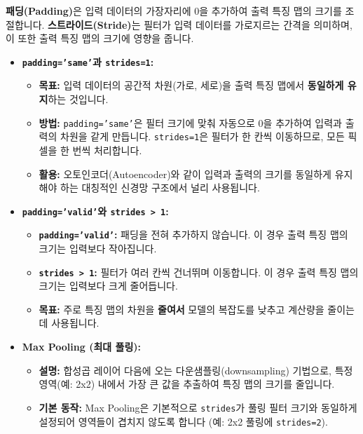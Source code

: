 \documentclass[11pt,a4paper]{article}
\theoremstyle{definition}
\begin{document}
\begin{tcolorbox}[summarybox, title=패딩과 스트라이드의 역할]
\textbf{패딩(Padding)}은 입력 데이터의 가장자리에 0을 추가하여 출력 특징 맵의 크기를 조절합니다.
\textbf{스트라이드(Stride)}는 필터가 입력 데이터를 가로지르는 간격을 의미하며, 이 또한 출력 특징 맵의 크기에 영향을 줍니다.
\end{tcolorbox}

\begin{itemize}
    \item \textbf{\texttt{padding='same'}과 \texttt{strides=1}:}
    \begin{itemize}
        \item \textbf{목표:} 입력 데이터의 공간적 차원(가로, 세로)을 출력 특징 맵에서 \textbf{동일하게 유지}하는 것입니다.
        \item \textbf{방법:} \texttt{padding='same'}은 필터 크기에 맞춰 자동으로 0을 추가하여 입력과 출력의 차원을 같게 만듭니다. \texttt{strides=1}은 필터가 한 칸씩 이동하므로, 모든 픽셀을 한 번씩 처리합니다.
        \item \textbf{활용:} 오토인코더(Autoencoder)와 같이 입력과 출력의 크기를 동일하게 유지해야 하는 대칭적인 신경망 구조에서 널리 사용됩니다.
    \end{itemize}
    \item \textbf{\texttt{padding='valid'}와 \texttt{strides > 1}:}
    \begin{itemize}
        \item \textbf{\texttt{padding='valid'}:} 패딩을 전혀 추가하지 않습니다. 이 경우 출력 특징 맵의 크기는 입력보다 작아집니다.
        \item \textbf{\texttt{strides > 1}:} 필터가 여러 칸씩 건너뛰며 이동합니다. 이 경우 출력 특징 맵의 크기는 입력보다 크게 줄어듭니다.
        \item \textbf{목표:} 주로 특징 맵의 차원을 \textbf{줄여서} 모델의 복잡도를 낮추고 계산량을 줄이는 데 사용됩니다.
    \end{itemize}
    \item \textbf{Max Pooling (최대 풀링):}
    \begin{itemize}
        \item \textbf{설명:} 합성곱 레이어 다음에 오는 다운샘플링(downsampling) 기법으로, 특정 영역(예: 2x2) 내에서 가장 큰 값을 추출하여 특징 맵의 크기를 줄입니다.
        \item \textbf{기본 동작:} Max Pooling은 기본적으로 \texttt{strides}가 풀링 필터 크기와 동일하게 설정되어 영역들이 겹치지 않도록 합니다 (예: 2x2 풀링에 \texttt{strides=2}).

\end{itemize}
\end{itemize}
\end{document}
